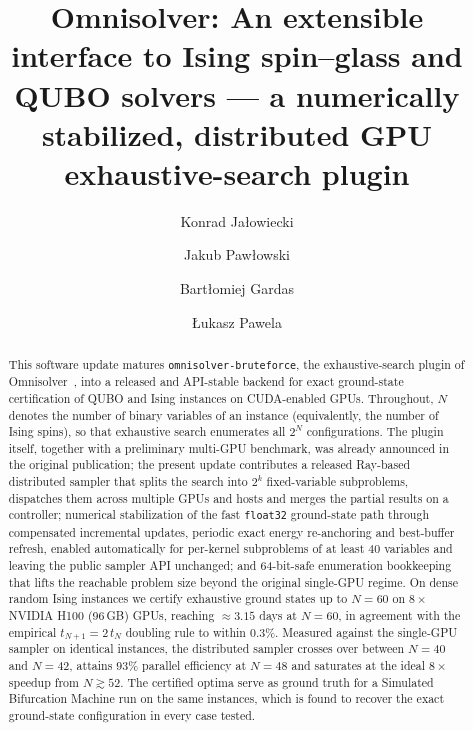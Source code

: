 \documentclass[preprint,12pt,a4paper]{elsarticle}
\begin{document}
\begin{frontmatter}

\title{Omnisolver: An extensible interface to Ising spin--glass and QUBO
solvers --- a numerically stabilized, distributed GPU exhaustive-search plugin}

\author[1]{Konrad Ja\l{}owiecki}
\author[2,3]{Jakub Paw{\l}owski}
\author[1,2]{Bart{\l}omiej Gardas}
\author[1,2]{{\L}ukasz Pawela}

\address[1]{Institute of Theoretical and Applied Informatics, Polish Academy
of Sciences, Ba{\l}tycka 5, 44-100 Gliwice, Poland}

\address[2]{Quantumz.io Sp. z o. o., Pu{\l}awska 12/3, 02-566 Warsaw, Poland}

\address[3]{Institute of Theoretical Physics, Faculty of Fundamental Problems
of Technology, Wroc{\l}aw University of Science and Technology,
50-370 Wroc{\l}aw, Poland}

\begin{abstract}
This software update matures \texttt{omnisolver-bruteforce}, the exhaustive-search
plugin of Omnisolver~\cite{jalowiecki2021omnisolver}, into a released and
API-stable backend for exact ground-state certification of QUBO and Ising
instances on CUDA-enabled GPUs. Throughout, $N$ denotes the number of binary
variables of an instance (equivalently, the number of Ising spins), so that
exhaustive search enumerates all $2^{N}$ configurations. The plugin itself,
together with a preliminary multi-GPU benchmark, was already announced in the
original publication; the present update contributes a released Ray-based
distributed sampler that splits the search into $2^{k}$ fixed-variable
subproblems, dispatches them across multiple GPUs and hosts and merges the
partial results on a controller; numerical stabilization of the fast
\texttt{float32} ground-state path through compensated incremental updates,
periodic exact energy re-anchoring and best-buffer refresh, enabled
automatically for per-kernel subproblems of at least $40$ variables and leaving
the public sampler API unchanged; and 64-bit-safe enumeration bookkeeping that
lifts the reachable problem size beyond the original single-GPU regime. On dense
random Ising instances we certify exhaustive ground states up to $N=60$ on
$8\times$ NVIDIA H100 (96\,GB) GPUs, reaching $\approx\!3.15$ days at $N=60$, in
agreement with the empirical $t_{N+1}=2\,t_N$ doubling rule to within $0.3\%$.
Measured against the single-GPU sampler on identical instances, the distributed
sampler crosses over between $N=40$ and $N=42$, attains $93\%$ parallel
efficiency at $N=48$ and saturates at the ideal $8\times$ speedup from
$N\!\gtrsim\!52$. The certified optima serve as ground truth for a Simulated
Bifurcation Machine run on the same instances, which is found to recover the
exact ground-state configuration in every case tested.
\end{abstract}


\end{frontmatter}
\end{document}
